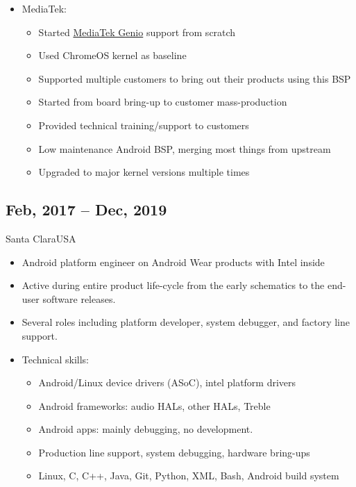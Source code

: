 \documentclass[a4paper,10pt,sans,colorlinks=true]{moderncv}
\begin{document}
{\begin{itemize}
\begin{itemize}
    \item Added board support in \href{https://android-review.googlesource.com/c/kernel/common/+/3296472}{Android Common Kernel}
    \item Worked with Android TV team for debugging or new features
    \end{itemize}
  \item MediaTek:
    \begin{itemize}
    \item Started \href{https://gitlab.baylibre.com/baylibre/mediatek/rita/device/mediatek}{MediaTek Genio} support from scratch
    \item Used ChromeOS kernel as baseline
    \item Supported multiple customers to bring out their products using this BSP
    \item Started from board bring-up to customer mass-production
    \item Provided technical training/support to customers
    \item Low maintenance Android BSP, merging most things from upstream
    \item Upgraded to major kernel versions multiple times
    \end{itemize}
  \end{itemize}
}

\subsection{Feb, 2017 -- Dec, 2019}
{Santa Clara}{USA}
{%
  \begin{itemize}
  \item Android platform engineer on Android Wear products with Intel inside
  \item Active during entire product life-cycle from the early schematics to the end-user software releases.
  \item Several roles including platform developer, system debugger, and factory line support.
  \item Technical skills:
    \begin{itemize}
    \item Android/Linux device drivers (ASoC), intel platform drivers
    \item Android frameworks: audio HALs, other HALs, Treble
    \item Android apps: mainly debugging, no development.
    \item Production line support, system debugging, hardware bring-ups
    \item Linux, C, C++, Java, Git, Python, XML, Bash, Android build system
    \end{itemize}
  \end{itemize}
}
\end{document}
